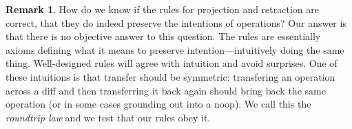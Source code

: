 \documentclass[english,submission]{programming}
\theoremstyle{definition}
\newtheorem*{remark}{Remark}
\newcommand{\mathbox}[1]{\colorbox{black!10}{$#1$\phantom{i\hspace{-3.5pt}}}}
\begin{document}
\begin{remark}
How do we know if the rules for projection and retraction are correct, that they do indeed preserve the intentions of operations? Our answer is that there is no objective answer to this question. The rules are essentially axioms defining what it means to preserve intention---intuitively doing the same thing. Well-designed rules will agree with intuition and avoid surprises. One of these intuitions is that transfer should be symmetric: transfering an operation across a diff and then transferring it back again should bring back the same operation (or in some cases grounding out into a \textsf{noop}). We call this the \textit{roundtrip law} and we test that our rules obey it.



\end{remark}
\end{document}
